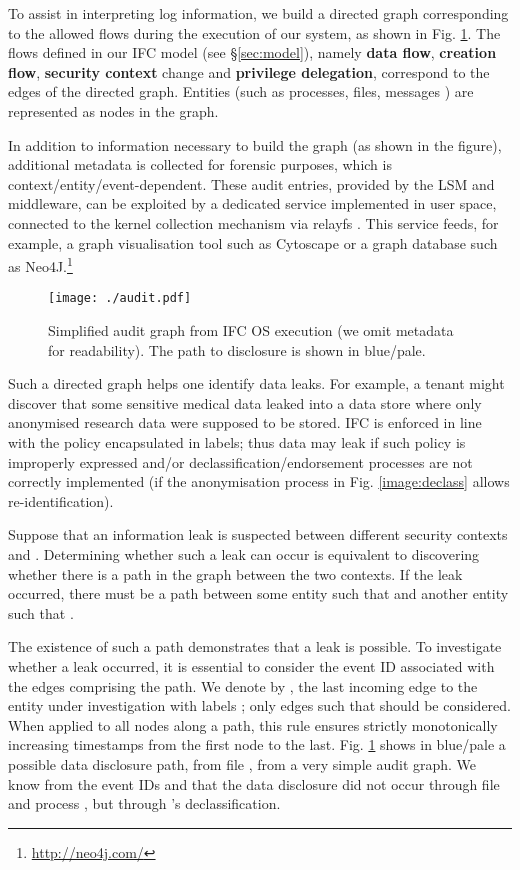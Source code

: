 \documentclass[10pt,journal,compsoc]{IEEEtran}
\begin{document}
To assist in interpreting log information, we build a directed graph corresponding to the allowed flows during the execution of our system, as shown in Fig. \ref{image:audit:graph}.
The flows defined in our IFC model (see \S\ref{sec:model}), namely \textbf{data flow}, \textbf{creation flow}, \textbf{security context} change and \textbf{privilege delegation}, correspond to the edges of the directed graph.
Entities (such as processes, files, messages \etc) are represented as nodes in the graph.

In addition to information necessary to build the graph (as shown in the figure), additional metadata is collected for forensic purposes, which is context/entity/event-dependent.
These audit entries, provided by the LSM and middleware, can be exploited by a dedicated service implemented in user space, connected to the kernel collection mechanism via \textsf{relayfs} \cite{zanussi2003relayfs}. 
This service feeds, for example, a graph visualisation tool such as Cytoscape \cite{smoot2011cytoscape} or a graph database such as Neo4J.\footnote{\url{http://neo4j.com/}}


\begin{figure}[t]
\centering
  \texttt{[image: ./audit.pdf]}
  \caption{Simplified audit graph from IFC OS execution (we omit metadata for readability). The path to disclosure is shown in blue\slash pale.} 
  \label{image:audit:graph}
\end{figure}


Such a directed graph helps one identify data  leaks. For example, a tenant might discover that some sensitive medical data leaked into a data store where only anonymised research data were supposed to be stored. 
IFC is enforced in line with the policy encapsulated in labels; thus data may leak if such policy is improperly expressed and\slash or declassification\slash endorsement processes are not correctly implemented (\eg if the anonymisation process in Fig. \ref{image:declass} allows re-identification).

Suppose that an information leak is suspected between different security contexts  and .  Determining whether such a leak can occur is equivalent to discovering whether there is a path in the graph between the two contexts.
If the leak occurred, there must be a path between some entity  such that  and another entity  such that . 

The existence of such a path demonstrates that a leak is possible. To investigate whether a leak occurred, it is essential to consider the event ID associated with the edges comprising the path.
We denote by , the last incoming edge to the entity under investigation with labels ; only edges such that  should be considered.
When applied to all nodes along a path, this rule ensures strictly monotonically increasing timestamps from the first node to the last. 
Fig. \ref{image:audit:graph} shows in blue\slash pale a possible data disclosure path, from file , from a very simple audit graph. We know from the event IDs  and  that the data disclosure did not occur through file  and process , but through 's declassification. 
\end{document}
